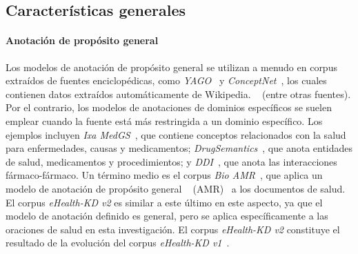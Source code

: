 \subsection{Características generales}

\paragraph{Anotación de propósito general}

Los modelos de anotación de propósito general se utilizan a menudo en corpus extraídos de fuentes enciclopédicas, como \textit{YAGO}~\cite{suchanek2007yago} y \textit{ConceptNet}~\cite{speer2017conceptnet}, los cuales contienen datos extraídos automáticamente de Wikipedia. ~ (entre otras fuentes). Por el contrario, los modelos de anotaciones de dominios específicos se suelen emplear cuando la fuente está más restringida a un dominio específico. Los ejemplos incluyen \textit{Ixa MedGS}~\cite{ORONOZ2015318}, que contiene conceptos relacionados con la salud para enfermedades, causas y medicamentos; \textit{DrugSemantics}~\cite{moreno2017drugsemantics}, que anota entidades de salud, medicamentos y procedimientos; y \textit{DDI}~\cite{herrero2013ddi}, que anota las interacciones fármaco-fármaco. Un término medio es el corpus \textit{Bio AMR}~\cite{bioamr}, que aplica un modelo de anotación de propósito general ~ (AMR)~\cite{banarescu2013abstract} a los documentos de salud. El corpus \textit{eHealth-KD v2} es similar a este último en este aspecto, ya que el modelo de anotación definido es general, pero se aplica específicamente a las oraciones de salud en esta investigación.
El corpus \textit{eHealth-KD v2} constituye el resultado de la evolución del corpus \textit{eHealth-KD v1}~\cite{ehealth}.

